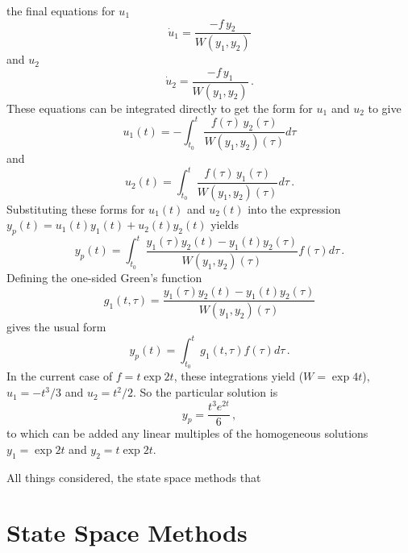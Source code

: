 \documentclass[10pt]{article}
\begin{document}
the final equations for $u_1$ 
\[
  {\dot u}_1 = \frac{-f \, y_2}{W(y_1,y_2)}
\]
and $u_2$
\[
  {\dot u}_2 = \frac{-f \, y_1}{W(y_1,y_2)} \, .
\]
These equations can be integrated directly to get the form for 
$u_1$ and $u_2$ to give
\[
  u_1(t) = - \int_{t_0}^t \frac{f(\tau) \, y_2(\tau)}{ W(y_1,y_2)(\tau) } d \tau
\]
and
\[
  u_2(t) =   \int_{t_0}^t \frac{f(\tau) \, y_1(\tau)}{ W(y_1,y_2)(\tau) } d \tau \, .
\]
Substituting these forms for $u_1(t)$ and $u_2(t)$ into the expression
$y_p(t) = u_1(t) y_1(t) + u_2(t) y_2(t)$ yields
\[
  y_p(t) = \int_{t_0}^{t} \frac{ y_1(\tau) y_2(t) - y_1(t) y_2(\tau) }{W(y_1,y_2)(\tau)} f(\tau) d \tau \, .
\]
Defining the one-sided Green's function
\[
  g_1(t,\tau) = \frac{ y_1(\tau) y_2(t) - y_1(t) y_2(\tau) }{W(y_1,y_2)(\tau)}
\]
gives the usual form
\[
  y_p(t) = \int_{t_0}^t g_1(t,\tau) f(\tau) d \tau \, .
\]
 In the current case of $f = t \exp{2 t}$, these 
integrations yield ($W = \exp{4 t}$), $u_1 = -t^3/3$ and $u_2 = t^2/2$.
So the particular solution is
\[
  y_p = \frac{t^3 e^{2t}}{6} \, ,
\]
to which can be added any linear multiples of the homogeneous solutions
$y_1 = \exp{2 t}$ and $y_2 = t \exp{2 t}$.

All things considered, the state space methods that 
\section{State Space Methods}
\end{document}
